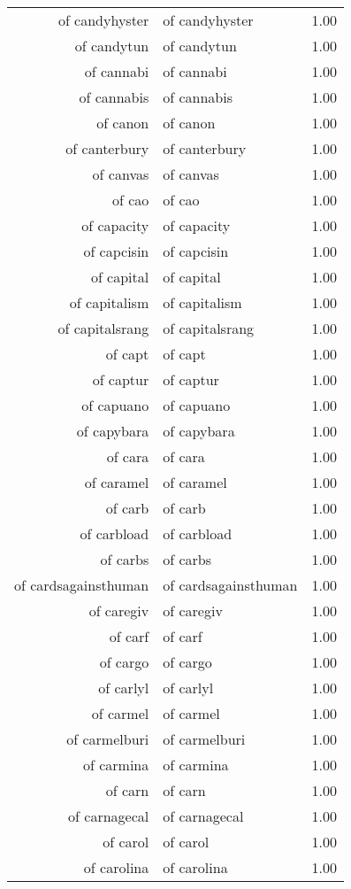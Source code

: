 \begin{table}[ht]
\begin{tabular}{rlr}
  of candyhyster & of candyhyster & 1.00 \\ 
  of candytun & of candytun & 1.00 \\ 
  of cannabi & of cannabi & 1.00 \\ 
  of cannabis & of cannabis & 1.00 \\ 
  of canon & of canon & 1.00 \\ 
  of canterbury & of canterbury & 1.00 \\ 
  of canvas & of canvas & 1.00 \\ 
  of cao & of cao & 1.00 \\ 
  of capacity & of capacity & 1.00 \\ 
  of capcisin & of capcisin & 1.00 \\ 
  of capital & of capital & 1.00 \\ 
  of capitalism & of capitalism & 1.00 \\ 
  of capitalsrang & of capitalsrang & 1.00 \\ 
  of capt & of capt & 1.00 \\ 
  of captur & of captur & 1.00 \\ 
  of capuano & of capuano & 1.00 \\ 
  of capybara & of capybara & 1.00 \\ 
  of cara & of cara & 1.00 \\ 
  of caramel & of caramel & 1.00 \\ 
  of carb & of carb & 1.00 \\ 
  of carbload & of carbload & 1.00 \\ 
  of carbs & of carbs & 1.00 \\ 
  of cardsagainsthuman & of cardsagainsthuman & 1.00 \\ 
  of caregiv & of caregiv & 1.00 \\ 
  of carf & of carf & 1.00 \\ 
  of cargo & of cargo & 1.00 \\ 
  of carlyl & of carlyl & 1.00 \\ 
  of carmel & of carmel & 1.00 \\ 
  of carmelburi & of carmelburi & 1.00 \\ 
  of carmina & of carmina & 1.00 \\ 
  of carn & of carn & 1.00 \\ 
  of carnagecal & of carnagecal & 1.00 \\ 
  of carol & of carol & 1.00 \\ 
  of carolina & of carolina & 1.00 \\ 

\end{tabular}
\end{table}
